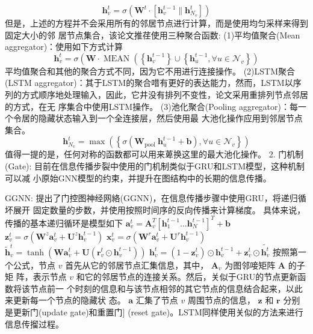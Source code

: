 \documentclass[a4paper,UTF8]{article}
\numberwithin{equation}{section}
\begin{document}
{		$$
		\mathbf{h}_{v}^{t}=\sigma\left(\mathbf{W}^{t} \cdot\left[\mathbf{h}_{v}^{t-1} \| \mathbf{h}_{N_{v}}^{t}\right]\right)
		$$
		但是，上述的方程并不会采用所有的邻居节点进行计算，而是使用均匀采样来得到固定大小的邻 居节点集合，该论文推荏使用三种聚合函数:
		(1)平均值聚合(Mean aggregator)：使用如下方式计算
		$$
		\mathbf{h}_{v}^{t}=\sigma\left(\mathbf{W} \cdot \operatorname{MEAN}\left(\left\{\mathbf{h}_{v}^{t-1}\right\} \cup\left\{\mathbf{h}_{u}^{t-1}, \forall u \in \mathcal{N}_{v}\right\}\right)\right.
		$$
		平均值聚合和其他的聚合方式不同，因为它不用进行连接操作。
		(2)LSTM聚合(LSTM aggregator)：其于LSTM的聚合唶有更好的表达能力，然而，LSTM以序 列的方式顺序地处理输入，因此，它井没有排列不变性，论文采用重排列节点邻居的方式，在无 序集合中使用LSTM操作。
		(3)池化聚合(Pooling aggregator)：每一个令居的隐藏状态输入到一个全连接层，然后使用最 大池化操作应用到邻居节点集合。
		$$
		\mathbf{h}_{N_{v}}^{t}=\max \left(\left\{\sigma\left(\mathbf{W}_{\text {pool }} \mathbf{h}_{u}^{t-1}+\mathbf{b}\right), \forall u \in \mathcal{N}_{v}\right\}\right)
		$$
		值得一提的是，任何对称的函数都可以用来萆换这里的最大池化操作。
		2. 门机制(Gate): 目前在信息传播步裂中使用的门机制类似于GRU和LSTM模型，这种机制可以减 小原始GNN模型的约束，并提升在图结构中的长期的信息传播。
		
		GGNN: \citep{conf/YujiaLi2016}提出了门控图神经网絡(GGNN)，在信息传播步骤中使用GRU，将递归循坏展开 固定数量的步数，并使用按照时间序的反向传播来计算梯度。
		具体来说，传播的基本递归循环是模型如下
		$\mathbf{a}_{v}^{t}=\mathbf{A}_{v}^{T}\left[\mathbf{h}_{1}^{t-1} \ldots \mathbf{h}_{N}^{t-1}\right]^{T}+\mathbf{b}$
		$\mathbf{z}_{v}^{t}=\sigma\left(\mathbf{W}^{z} \mathbf{a}_{v}^{t}+\mathbf{U}^{z} \mathbf{h}_{v}^{t-1}\right)$
		$\mathbf{x}_{v}^{t}=\sigma\left(\mathbf{W}^{r} \mathbf{a}_{v}^{t}+\mathbf{U}^{r} \mathbf{h}_{v}^{t-1}\right)$
		$\widetilde{\mathbf{h}}_{v}^{t}=\tanh \left(\mathbf{W} \mathbf{a}_{v}^{t}+\mathbf{U}\left(\mathbf{r}_{v}^{t} \odot \mathbf{h}_{v}^{t-1}\right)\right)$
		$\mathbf{h}_{v}^{t}=\left(1-\mathbf{z}_{v}^{t}\right) \odot \mathbf{h}_{v}^{t-1}+\mathbf{z}_{v}^{t} \odot \widetilde{\mathbf{h}_{v}^{t}}$
		按照第一个公式，节点 $v$ 首先从它的邻居节点汇集信息，其中， $\mathbf{A}_{v}$ 为图邻唼矩阵 $\mathbf{A}$ 的子矩 阵，表示节点 $v$ 和它的邻居节点的连接关系。然后，关似于GRU的节点更新函数将该节点前一 个时刻的信息和与该节点相邻的其它节点的信息结合起来，以此来更新每一个节点的隐藏状 态。 $\mathbf{a}$ 汇集了节点 $v$ 周围节点的信息， $\mathbf{z}$ 和 $\mathbf{r}$ 分别是更新门(update gate)和重置门] (reset gate)。LSTM同样使用关似的方法来进行信息传㨨过程。
		
}
\end{document}
